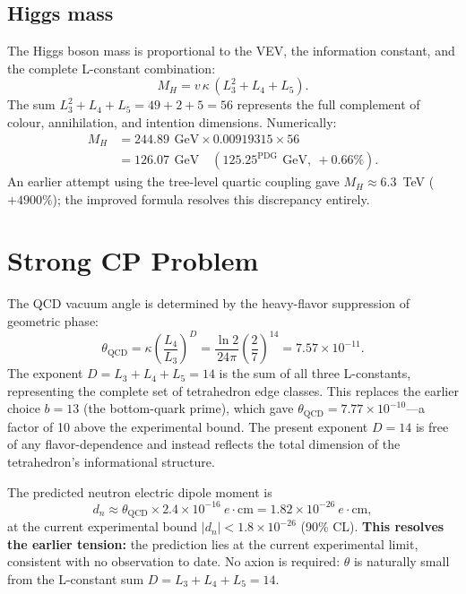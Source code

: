 \documentclass[aps,prd,reprint,twocolumn,showpacs,superscriptaddress]{revtex4-2}
\newcommand{\gev}{\,\text{GeV}}
\newcommand{\PDG}[1]{\ensuremath{#1^{\text{PDG}}}}
\begin{document}
\subsection{Higgs mass}

The Higgs boson mass is proportional to the VEV, the information
constant, and the complete L-constant combination:
\begin{equation}
M_H = v\,\kappa\,(L_3^2 + L_4 + L_5).
\end{equation}
The sum $L_3^2 + L_4 + L_5 = 49 + 2 + 5 = 56$ represents the full
complement of colour, annihilation, and intention dimensions.
Numerically:
\begin{align}
M_H &= 244.89\ \gev \times 0.00919315 \times 56 \\
    &= 126.07\ \gev
    \quad (\PDG{125.25}\ \gev,\ +0.66\%).
\end{align}
An earlier attempt using the tree-level quartic coupling gave
$M_H \approx 6.3$~TeV ($+4900\%$); the improved formula resolves this
discrepancy entirely.

\section{Strong CP Problem}
\label{sec:strongcp}

The QCD vacuum angle is determined by the
heavy-flavor suppression of geometric phase:
\begin{equation}
\theta_{\text{QCD}} = \kappa \left(\frac{L_4}{L_3}\right)^{D}
                    = \frac{\ln 2}{24\pi} \left(\frac{2}{7}\right)^{14}
                    = 7.57 \times 10^{-11}.
\end{equation}
The exponent $D = L_3 + L_4 + L_5 = 14$ is the sum of all three
L-constants, representing the complete set of tetrahedron edge classes.
This replaces the earlier choice $b = 13$ (the bottom-quark prime),
which gave $\theta_{\text{QCD}} = 7.77 \times 10^{-10}$---a factor of
10 above the experimental bound.  The present exponent $D = 14$ is
free of any flavor-dependence and instead reflects the total dimension
of the tetrahedron's informational structure.

The predicted neutron electric dipole moment is
\begin{equation}
d_n \approx \theta_{\text{QCD}} \times 2.4 \times 10^{-16}\ e\cdot\text{cm}
      = 1.82 \times 10^{-26}\ e\cdot\text{cm},
\end{equation}
at the current experimental bound $|d_n| < 1.8 \times 10^{-26}$
(90\% CL).  \textbf{This resolves the earlier tension:} the prediction
lies at the current experimental limit, consistent with no observation
to date.  No axion is required: $\theta$ is naturally small from the
L-constant sum $D = L_3+L_4+L_5 = 14$.
\end{document}
